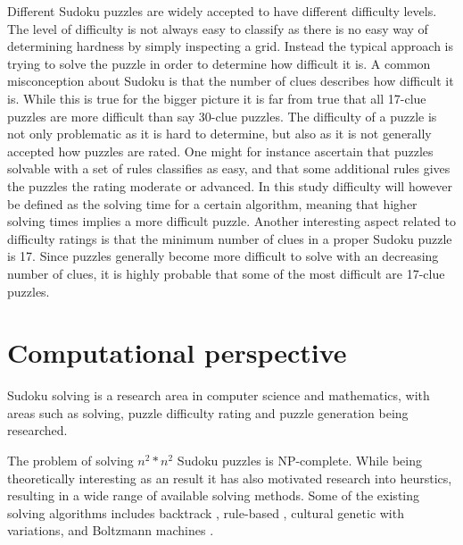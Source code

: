 \documentclass[a4paper,11pt]{kth-mag}
\begin{document}
Different Sudoku puzzles are widely accepted to have different difficulty levels.
The level of difficulty is not always easy to classify as there is no easy way of determining hardness by simply inspecting a grid.
Instead the typical approach is trying to solve the puzzle in order to determine how difficult it is.
A common misconception about Sudoku is that the number of clues describes how difficult it is.
While this is true for the bigger picture it is far from true that all 17-clue puzzles are more difficult than say 30-clue puzzles.\cite{sudokuDifficulty}
The difficulty of a puzzle is not only problematic as it is hard to determine, but also as it is not generally accepted how puzzles are rated.
One might for instance ascertain that puzzles solvable with a set of rules classifies as easy, and that some additional rules gives the puzzles the rating moderate or advanced.
In this study difficulty will however be defined as the solving time for a certain algorithm, meaning that higher solving times implies a more difficult puzzle.
Another interesting aspect related to difficulty ratings is that the minimum number of clues in a proper Sudoku puzzle is 17.\cite{17clueProof} 
Since puzzles generally become more difficult to solve with an decreasing number of clues, it is highly probable that some of the most difficult are 17-clue puzzles. 

\FloatBarrier
\section{Computational perspective}
Sudoku solving is a research area in computer science and mathematics, with areas such as solving, puzzle difficulty rating and puzzle generation being researched.\cite{stochastic, sudokuConstruct, generation}

The problem of solving $n^2 * n^2$ Sudoku puzzles is NP-complete.\cite{complexity}
While being theoretically interesting as an result it has also motivated research into heurstics, resulting in a wide range of available solving methods.
Some of the existing solving algorithms includes backtrack \cite{searchBased}, rule-based \cite{techniques}, cultural genetic with variations\cite{stochastic}, and Boltzmann machines \cite{boltzmann}.
\end{document}

